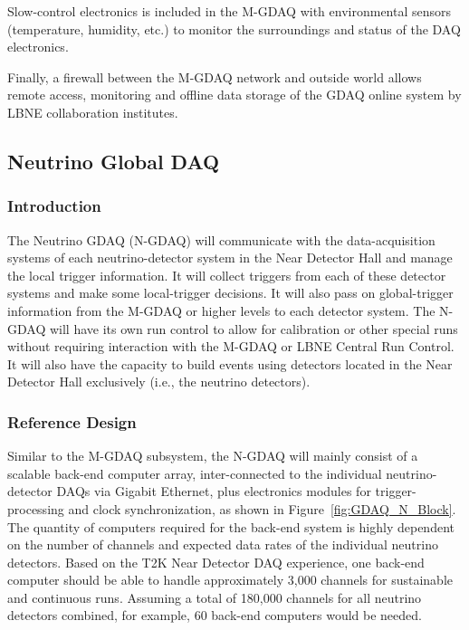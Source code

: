 Slow-control electronics is included in the M-GDAQ  %
with environmental 
sensors (temperature, humidity, etc.) to monitor the surroundings and 
status of the DAQ electronics.

Finally, a firewall between the M-GDAQ  %
network and outside world allows 
remote access, monitoring and offline data storage of the GDAQ online 
system by LBNE collaboration institutes.

\subsection{Neutrino Global DAQ}
\label{subsec:N-GDAQ}

\subsubsection{Introduction} %

The Neutrino GDAQ (N-GDAQ) will communicate with the data-acquisition 
systems of each neutrino-detector system in the Near Detector Hall %
and manage the local trigger information. %
It will 
collect triggers from each of these detector systems and make some local-trigger 
decisions. It will also pass on global-trigger information from the %
M-GDAQ  %
or higher levels to each detector system. The N-GDAQ will have its 
own run control to allow for calibration or other special runs without 
requiring interaction with the %
M-GDAQ  %
or LBNE Central Run Control. It 
will also have the capacity to build events using detectors %
located in the Near Detector Hall exclusively (i.e., the neutrino detectors).

\subsubsection{Reference Design}

Similar to the M-GDAQ subsystem, the N-GDAQ will 
mainly consist of a scalable back-end computer array, inter-connected to 
the individual neutrino-detector DAQs via Gigabit Ethernet, plus electronics 
modules for trigger-processing and clock synchronization, as shown in Figure~\ref{fig:GDAQ_N_Block}. The %
quantity of 
computers required for the back-end system is highly dependent on the 
number of channels and expected data rates of the individual %
neutrino detectors. Based on the T2K Near Detector DAQ experience, one back-end computer 
should be able to handle approximately 3,000 channels for sustainable and 
continuous runs. Assuming a total of 180,000 channels for all %
neutrino detectors combined, for example, 60 back-end computers  would be needed.

